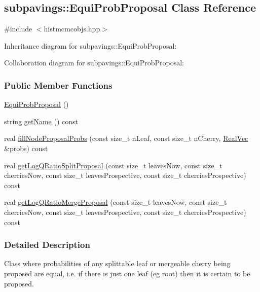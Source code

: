 \hypertarget{classsubpavings_1_1EquiProbProposal}{\subsection{subpavings\-:\-:\-Equi\-Prob\-Proposal \-Class \-Reference}
\label{classsubpavings_1_1EquiProbProposal}
}


{\ttfamily \#include $<$histmcmcobjs.\-hpp$>$}



\-Inheritance diagram for subpavings\-:\-:\-Equi\-Prob\-Proposal\-:


\-Collaboration diagram for subpavings\-:\-:\-Equi\-Prob\-Proposal\-:
\subsubsection*{\-Public \-Member \-Functions}
\begin{DoxyCompactItemize}
\item 
\hyperlink{classsubpavings_1_1EquiProbProposal_a0061c48b37e74ebd4f15426d90e7f87a}{\-Equi\-Prob\-Proposal} ()
\item 
string \hyperlink{classsubpavings_1_1EquiProbProposal_afc31fba60e3a5686d4431f7236597ae8}{get\-Name} () const 
\item 
real \hyperlink{classsubpavings_1_1EquiProbProposal_a69979ac7c2578262f03556e763e81558}{fill\-Node\-Proposal\-Probs} (const size\-\_\-t n\-Leaf, const size\-\_\-t n\-Cherry, \hyperlink{namespacesubpavings_af2d57bb6e12f4a73169f2e496d6a641f}{\-Real\-Vec} \&probs) const 
\item 
real \hyperlink{classsubpavings_1_1EquiProbProposal_a14cfb9c0c63ee3a5d1ed978cac89b903}{get\-Log\-Q\-Ratio\-Split\-Proposal} (const size\-\_\-t leaves\-Now, const size\-\_\-t cherries\-Now, const size\-\_\-t leaves\-Prospective, const size\-\_\-t cherries\-Prospective) const 
\item 
real \hyperlink{classsubpavings_1_1EquiProbProposal_af7a44db43cc40978a791913baf083661}{get\-Log\-Q\-Ratio\-Merge\-Proposal} (const size\-\_\-t leaves\-Now, const size\-\_\-t cherries\-Now, const size\-\_\-t leaves\-Prospective, const size\-\_\-t cherries\-Prospective) const 
\end{DoxyCompactItemize}


\subsubsection{\-Detailed \-Description}
\-Class where probabilities of any splittable leaf or mergeable cherry being proposed are equal, i.\-e. if there is just one leaf (eg root) then it is certain to be proposed. 

